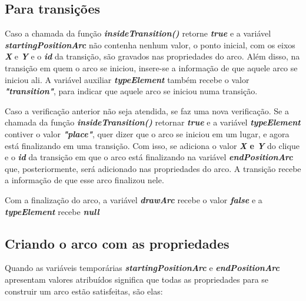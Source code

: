 \documentclass[
	12pt,				%
	openright,			%
	oneside,			%
	a4paper,			%
	english,			%
	brazil				%
	]{abntex2}
\begin{document}


\subsection*{Para transições}

Caso a chamada da função \textbf{\textit{insideTransition()}} retorne \textbf{\textit{true}} e a variável \textbf{\textit{startingPositionArc}} não contenha nenhum valor, o ponto inicial, com os eixos \textbf{\textit{X}} e \textbf{\textit{Y}} e o \textbf{\textit{id}} da transição, são gravados nas propriedades do arco. Além disso, na transição em quem o arco se iniciou, insere-se a informação de que aquele arco se iniciou ali. A variável auxiliar \textbf{\textit{typeElement}} também recebe o valor \textbf{\textit{"transition"}}, para indicar que aquele arco se iniciou numa transição. 

Caso a verificação anterior não seja atendida, se faz uma nova verificação. Se a chamada da função \textbf{\textit{insideTransition()}} retornar \textbf{\textit{true}} e a variável \textbf{\textit{typeElement}} contiver o valor \textbf{\textit{"place"}}, quer dizer que o arco se iniciou em um lugar, e agora está finalizando em uma transição. Com isso, se adiciona o valor \textbf{\textit{X} e \textbf{\textit{Y}}} do clique e o \textbf{\textit{id}} da transição em que o arco está finalizando na variável \textbf{\textit{endPositionArc}} que, posteriormente, será adicionado nas propriedades do arco. A transição recebe a informação de que esse arco finalizou nele.

Com a finalização do arco, a variável \textbf{\textit{drawArc}} recebe o valor \textbf{\textit{false}} e a \textbf{\textit{typeElement}} recebe \textbf{\textit{null}}



\subsection*{Criando o arco com as propriedades}

Quando as variáveis temporárias \textbf{\textit{startingPositionArc}} e \textbf{\textit{endPositionArc}} apresentam valores atribuídos significa que todas as propriedades para se construir um arco estão satisfeitas, são elas:
\end{document}
